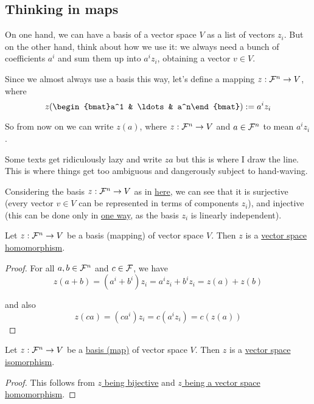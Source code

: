\nextsection
\subsection{Thinking in maps}\label{c900c55}

\label{f62907b}

\cvn On one hand, we can have a basis of a vector space $V$ as a list of vectors
$z_i$. But on the other hand, think about how we use it: we always need a bunch
of coefficients $a^i$ and sum them up into $a^iz_i$, obtaining a vector $v\in
V$.

Since we almost always use a basis this way, let's define a mapping $z:\mathcal F^n\to
V$, where
$$
  z(\begin{bmat}a^1 & \ldots & a^n\end{bmat}):=a^iz_i
$$

So from now on we can write $z(a)$, where $z:\mathcal F^n\to V$ and $a\in\mathcal F^n$ to mean
$a^iz_i$.

Some texts get ridiculously lazy and write $za$ but this is where I draw the
line. This is where things get too ambiguous and dangerously subject to
hand-waving.

\label{cb839f5}

\cvn Considering the basis $z:\mathcal F^n\to V$ as in \href{f62907b}{here}, we
can see that it is surjective (every vector $v\in V$ can be represented in terms
of components $z_i$), and injective (this can be done only in \href{c133a44}{one
way}, as the basis $z_i$ is linearly independent).

\label{ef33059}

\cvn Let $z:\mathcal F^n\to V$ be a basis (mapping) of vector space $V$. Then
$z$ is a \href{eacdfee}{vector space homomorphism}.

\begin{proof}
  For all $a,b\in\mathcal F^n$ and $c\in\mathcal F$, we have
  $$
    z(a+b)=(a^i+b^i)z_i=a^iz_i+b^iz_i=z(a)+z(b)
  $$

  and also
  $$
    z(ca)=(ca^i)z_i=c(a^iz_i)=c(z(a))
  $$
\end{proof}

\label{c328009}

Let $z:\mathcal F^n\to V$ be a \href{f62907b}{basis (map)} of vector space $V$. Then
$z$ is a \href{fc59d72}{vector space isomorphism}.

\begin{proof}
  This follows from \href{cb839f5}{$z$ being bijective} and \href{ef33059}{$z$
  being a vector space homomorphism}.
\end{proof}

